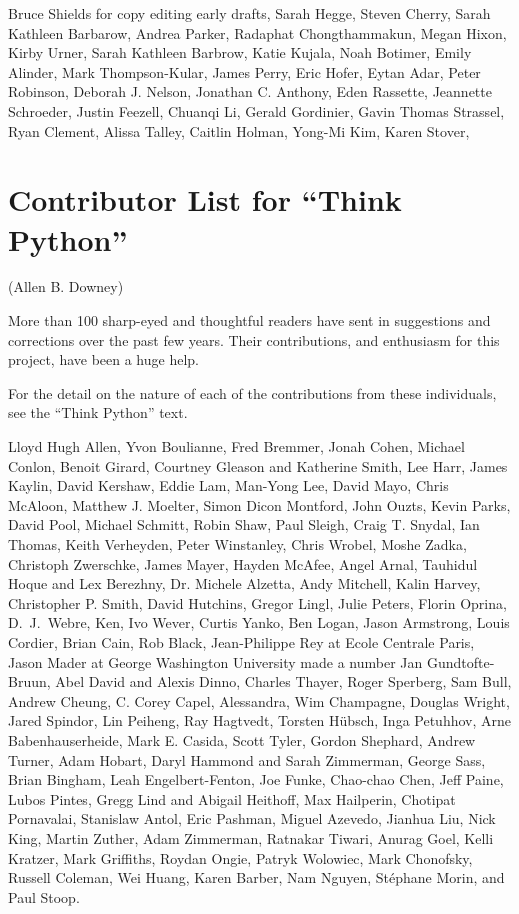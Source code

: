 \documentclass[10pt]{book}
\begin{document}
Bruce Shields for copy editing early drafts,
Sarah Hegge,
Steven Cherry,
Sarah Kathleen Barbarow,
Andrea Parker,
Radaphat Chongthammakun,
Megan Hixon,
Kirby Urner,
Sarah Kathleen Barbrow,
Katie Kujala,
Noah Botimer,
Emily Alinder,
Mark Thompson-Kular,
James Perry,
Eric Hofer,
Eytan Adar,
Peter Robinson,
Deborah J. Nelson,
Jonathan C. Anthony,
Eden Rassette,
Jeannette Schroeder,
Justin Feezell,
Chuanqi Li,
Gerald Gordinier,
Gavin Thomas Strassel,
Ryan Clement,
Alissa Talley,
Caitlin Holman,
Yong-Mi Kim,
Karen Stover,


\section*{Contributor List for ``Think Python''}


(Allen B. Downey)

More than 100 sharp-eyed and thoughtful readers have sent in
suggestions and corrections over the past few years.  Their
contributions, and enthusiasm for this project, have been a
huge help.

For the detail on the nature of each of the contributions from
these individuals, see the ``Think Python'' text.

Lloyd Hugh Allen,
Yvon Boulianne,
Fred Bremmer,
Jonah Cohen,
Michael Conlon,
Benoit Girard,
Courtney Gleason and Katherine Smith,
Lee Harr,
James Kaylin,
David Kershaw,
Eddie Lam,
Man-Yong Lee,
David Mayo,
Chris McAloon,
Matthew J. Moelter,
Simon Dicon Montford,
John Ouzts,
Kevin Parks,
David Pool,
Michael Schmitt,
Robin Shaw,
Paul Sleigh,
Craig T. Snydal,
Ian Thomas,
Keith Verheyden,
Peter Winstanley,
Chris Wrobel,
Moshe Zadka,
Christoph Zwerschke,
James Mayer,
Hayden McAfee,
Angel Arnal,
Tauhidul Hoque and Lex Berezhny,
Dr. Michele Alzetta,
Andy Mitchell,
Kalin Harvey,
Christopher P. Smith,
David Hutchins,
Gregor Lingl,
Julie Peters,
Florin Oprina,
D.~J.~Webre,
Ken,
Ivo Wever,
Curtis Yanko,
Ben Logan,
Jason Armstrong,
Louis Cordier,
Brian Cain,
Rob Black,
Jean-Philippe Rey at Ecole Centrale Paris,
Jason Mader at George Washington University made a number
Jan Gundtofte-Bruun,
Abel David and Alexis Dinno,
Charles Thayer,
Roger Sperberg,
Sam Bull,
Andrew Cheung,
C. Corey Capel,
Alessandra,
Wim Champagne,
Douglas Wright,
Jared Spindor,
Lin Peiheng,
Ray Hagtvedt,
Torsten H\"{u}bsch,
Inga Petuhhov,
Arne Babenhauserheide,
Mark E. Casida,
Scott Tyler,
Gordon Shephard,
Andrew Turner,
Adam Hobart,
Daryl Hammond and Sarah Zimmerman,
George Sass,
Brian Bingham,
Leah Engelbert-Fenton,
Joe Funke,
Chao-chao Chen,
Jeff Paine,
Lubos Pintes,
Gregg Lind and Abigail Heithoff,
Max Hailperin,
Chotipat Pornavalai,
Stanislaw Antol,
Eric Pashman,
Miguel Azevedo,
Jianhua Liu,
Nick King,
Martin Zuther,
Adam Zimmerman,
Ratnakar Tiwari,
Anurag Goel,
Kelli Kratzer,
Mark Griffiths,
Roydan Ongie,
Patryk Wolowiec,
Mark Chonofsky,
Russell Coleman,
Wei Huang,
Karen Barber,
Nam Nguyen,
St\'{e}phane Morin,
and
Paul Stoop.

\normalsize

\printindex

\clearemptydoublepage
\end{document}
